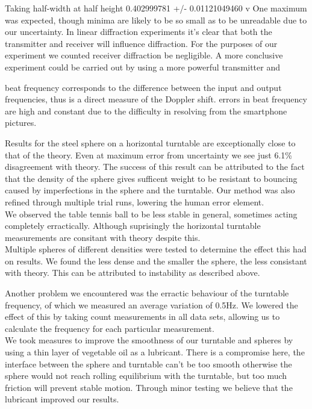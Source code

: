 \documentclass[a4paper,10pt,journal]{IEEEtran}
\begin{document}
Taking half-width at half height 0.402999781 +/- 0.01121049460 v
One maximum was expected, though minima are likely to be so small as to be unreadable due to our uncertainty.
In linear diffraction experiments it's clear that both the transmitter and receiver will influence diffraction. For the purposes of our experiment we counted receiver diffraction be negligible. A more conclusive experiment could be carried out by using a more powerful transmitter and

beat frequency corresponds to the difference between the input and output frequencies, thus is a direct measure of the Doppler shift.
errors in beat frequency are high and constant due to the difficulty in resolving from the smartphone pictures.

Results for the steel sphere on a horizontal turntable are exceptionally close to that of the theory. Even at maximum error from uncertainty we see just 6.1\% disagreement with theory. The success of this result can be attributed to the fact that the density of the sphere gives sufficent weight to be resistant to bouncing caused by imperfections in the sphere and the turntable. Our method was also refined through multiple trial runs, lowering the human error element.\\
We observed the table tennis ball to be less stable in general, sometimes acting completely erractically. Although suprisingly the horizontal turntable measurements are consitant with theory despite this.\\

Multiple spheres of different densities were tested to determine the effect this had on results. We found the less dense and the smaller the sphere, the less consistant with theory. This can be attributed to instability as described above.

Another problem we encountered was the erractic behaviour of the turntable frequency, of which we measured an average variation of 0.5Hz. We lowered the effect of this by taking count measurements in all data sets, allowing us to calculate the frequency for each particular measurement.\\
We took measures to improve the smoothness of our turntable and spheres by using a thin layer of vegetable oil as a lubricant. There is a compromise here, the interface between the sphere and turntable can't be too smooth otherwise the sphere would not reach rolling equilibrium with the turntable, but too much friction will prevent stable motion. Through minor testing we believe that the lubricant improved our results.
\end{document}
